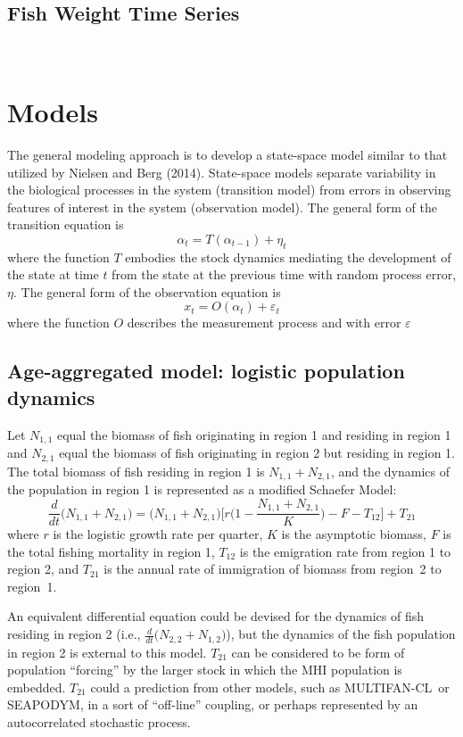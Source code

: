 \documentclass[12pt,letterpaper]{article}
\newcommand\SD{SEAPODYM}
\newcommand\MFCL{MULTIFAN-CL}
\newcommand\help[1]{\color{Magenta}{\it #1 }\normalcolor}
\newcommand\None{{N_{1,1}}}
\newcommand\Ntwo{{N_{2,1}}}
\newcommand\Nsum{{N_{1,1}+N_{2,1}}}
\begin{document}
\subsection*{Fish Weight Time Series}
~
\centerline{\help{Not yet available.}}

\section*{Models}
The general modeling approach is to develop a state-space model
similar to that utilized by Nielsen and Berg (2014).
State-space models separate variability in the biological
processes in the system (transition model)
from errors in observing features of interest
in the system (observation model). 
The general form of the transition equation is
\begin{equation}
\alpha_t=T(\alpha_{t-1}) + \eta_t
\end{equation}
where the function $T$ embodies the stock dynamics mediating the
development of the state at time $t$ from the state at the previous
time with random process error, $\eta$.
The general form of the observation equation is
\begin{equation}
x_t = O(\alpha_t) + \varepsilon_t
\end{equation}
where the function $O$ describes the measurement process and with
error $\varepsilon$

\subsection*{Age-aggregated model: logistic population dynamics}

Let $\None$ equal the biomass of fish originating in region 1
and residing in region 1
and $\Ntwo$ equal the biomass of fish originating in region 2
but residing in region 1.
The total biomass of fish residing in region 1 is
$\Nsum$, and the dynamics of the population in region 1 is represented
as a modified Schaefer Model:
\begin{equation}
\frac{d}{dt}\big(\Nsum\big)=\big(\Nsum\big)\Big[r\Big(1-\frac{\Nsum}{K}\Big)-F-T_{12}\Big]+T_{21}
\label{eqn:logistic}
\end{equation}
where $r$ is the logistic growth rate per quarter, $K$ is the
asymptotic biomass,
$F$ is the total fishing mortality in region 1, $T_{12}$
is the emigration rate from region 1 to region 2, and $T_{21}$
is the annual rate of immigration of biomass from region~2 to region~1.


An equivalent differential equation could be devised for the dynamics of
fish residing in region 2 
(i.e., $\frac{d}{dt}\big(N_{2,2}+N_{1,2}\big)$), but 
the dynamics of the fish population in region 2 is external to this
model. $T_{21}$ can be considered to be form of population ``forcing''
by the larger stock in which the MHI population is embedded. $T_{21}$
could a prediction from other models, such as \MFCL\ or \SD, in a sort of
``off-line'' coupling, or perhaps represented by an
autocorrelated stochastic process. 
\end{document}
